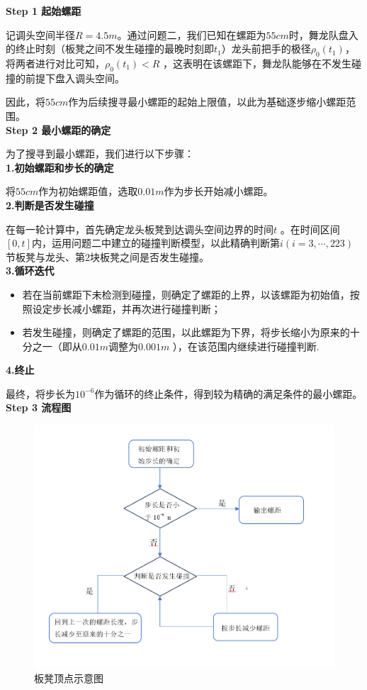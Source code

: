 \documentclass[../main.tex]{subfiles}
\begin{document}
  \noindent\textbf{Step 1 起始螺距}
  \par   记调头空间半径\(R = 4.5m\)。通过问题二，我们已知在螺距为\(55cm\)时，舞龙队盘入的终止时刻（板凳之间不发生碰撞的最晚时刻即$t_1$）龙头前把手的极径$\rho _0(t_1)$，将两者进行对比可知，\(\rho _0(t_1)<R\) ，这表明在该螺距下，舞龙队能够在不发生碰撞的前提下盘入调头空间。
  \par 因此，将\(55cm\)作为后续搜寻最小螺距的起始上限值，以此为基础逐步缩小螺距范围。
  \\\textbf{Step 2 最小螺距的确定}
  \par 为了搜寻到最小螺距，我们进行以下步骤：
  \\\noindent\textbf{1.初始螺距和步长的确定}
  \par 将\(55cm\)作为初始螺距值，选取\(0.01m\)作为步长开始减小螺距。
  \\\noindent\textbf{2.判断是否发生碰撞}
  \par 在每一轮计算中，首先确定龙头板凳到达调头空间边界的时间\(t\) 。在时间区间\([0, t]\)内，运用问题二中建立的碰撞判断模型，以此精确判断第$i(i=3,\cdots,223)$节板凳与龙头、第\(2\)块板凳之间是否发生碰撞。
  \\\noindent\textbf{3.循环迭代}
  \begin{itemize}
  \item 若在当前螺距下未检测到碰撞，则确定了螺距的上界，以该螺距为初始值，按照设定步长减小螺距，并再次进行碰撞判断；
  \item 若发生碰撞，则确定了螺距的范围，以此螺距为下界，将步长缩小为原来的十分之一（即从\(0.01m\)调整为\(0.001m\) ），在该范围内继续进行碰撞判断.
  \end{itemize}
  \noindent\textbf{4.终止}
  \par 最终，将步长为$10^{-6}$作为循环的终止条件，得到较为精确的满足条件的最小螺距。
  \textbf{Step 3 流程图 }
  \begin{figure}[H]
    \centering
    \includegraphics[width=.6\textwidth]{1234}
    \caption{板凳顶点示意图}
    \label{1.1.1.1.1.1.1.1.1.1.1}
\end{figure}

  
\end{document}
